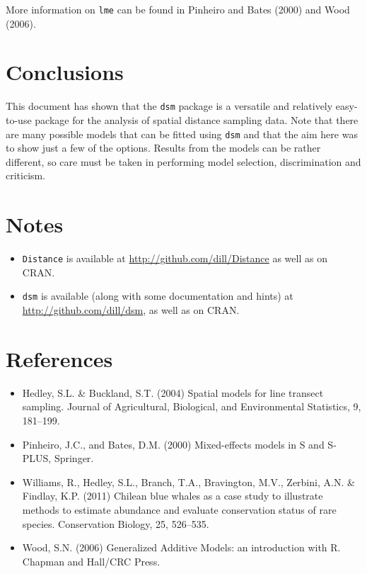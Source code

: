 \documentclass[]{article}
\begin{document}
More information on \texttt{lme} can be found in Pinheiro and Bates
(2000) and Wood (2006).

\section{Conclusions}\label{conclusions}

This document has shown that the \texttt{dsm} package is a versatile and
relatively easy-to-use package for the analysis of spatial distance
sampling data. Note that there are many possible models that can be
fitted using \texttt{dsm} and that the aim here was to show just a few
of the options. Results from the models can be rather different, so care
must be taken in performing model selection, discrimination and
criticism.

\section{Notes}\label{notes}

\begin{itemize}[<+->]
\itemsep1pt\parskip0pt
\item
  \texttt{Distance} is available at
  \url{http://github.com/dill/Distance} as well as on CRAN.
\item
  \texttt{dsm} is available (along with some documentation and hints) at
  \url{http://github.com/dill/dsm}, as well as on CRAN.
\end{itemize}

\section{References}\label{references}

\begin{itemize}[<+->]
\itemsep1pt\parskip0pt
\item
  Hedley, S.L. \& Buckland, S.T. (2004) Spatial models for line transect
  sampling. Journal of Agricultural, Biological, and Environmental
  Statistics, 9, 181--199.
\item
  Pinheiro, J.C., and Bates, D.M. (2000) Mixed-effects models in S and
  S-PLUS, Springer.
\item
  Williams, R., Hedley, S.L., Branch, T.A., Bravington, M.V., Zerbini,
  A.N. \& Findlay, K.P. (2011) Chilean blue whales as a case study to
  illustrate methods to estimate abundance and evaluate conservation
  status of rare species. Conservation Biology, 25, 526--535.
\item
  Wood, S.N. (2006) Generalized Additive Models: an introduction with R.
  Chapman and Hall/CRC Press.
\end{itemize}
\end{document}
